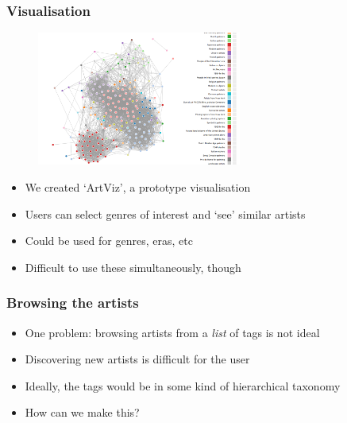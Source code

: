 \documentclass{beamer}
\begin{document}
\begin{frame}
    \frametitle{Visualisation}
    \begin{figure}
        \centering
        \includegraphics[width=0.6\textwidth]{artvis1.png}
    \end{figure}
        \begin{itemize}
            \item We created `ArtViz', a prototype visualisation
            \item Users can select genres of interest and `see' similar artists
            \item Could be used for genres, eras, etc
            \item Difficult to use these simultaneously, though
        \end{itemize}
\end{frame}

\begin{frame}
    \frametitle{Browsing the artists}
        \begin{itemize}
          \item One problem: browsing artists from a \emph{list} of tags is not ideal
            \item Discovering new artists is difficult for the user
            \item Ideally, the tags would be in some kind of hierarchical taxonomy
            \item How can we make this?
        \end{itemize}
\end{frame}
\end{document}

